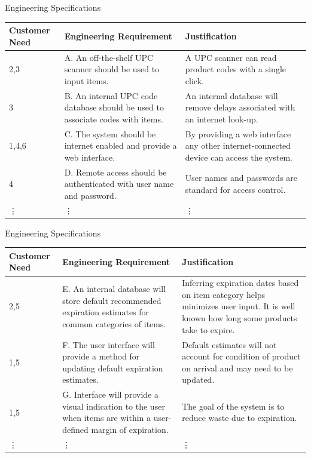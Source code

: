 \documentclass[t]{beamer}
\begin{document}
\begin{frame}{Engineering Specifications}
\footnotesize
\begin{tabular}{| p{0.6in} | p{2in} |p{1.5in} |}
\hline
Customer Need & Engineering Requirement & Justification \\
\hline
2,3 &A. An off-the-shelf UPC scanner should be used to input items. & A UPC scanner can read product codes with a single click.\\
\hline
3 &B. An internal UPC code database should be used to associate codes with items.&An internal database will remove delays associated with an internet look-up.\\
\hline
1,4,6&C. The system should be internet enabled and provide a web interface.&By providing a web interface any other internet-connected device can access the system.\\
\hline
4&D. Remote access should be authenticated with user name and password.&User names and passwords are standard for access control.\\
\hline
\vdots & \vdots & \vdots \\
\hline
\end{tabular}
\end{frame}

\begin{frame}{Engineering Specifications}
\footnotesize
\begin{tabular}{| p{0.6in} | p{2in} |p{1.5in} |}
\hline
Customer Need & Engineering Requirement & Justification \\
\hline
2,5&E. An internal database will store default recommended expiration estimates for common categories of items.&Inferring expiration dates based on item category helps minimizes user input. It is well known how long some products take to expire.\\
\hline
1,5&F. The user interface will provide a method for updating default expiration estimates.&Default estimates will not account for condition of product on arrival and may need to be updated.\\
\hline
1,5&G. Interface will provide a visual indication to the user when items are within a user-defined margin of expiration.&The goal of the system is to reduce waste due to expiration.\\
\hline
\vdots & \vdots & \vdots \\
\hline
\end{tabular}
\end{frame}
\end{document}
